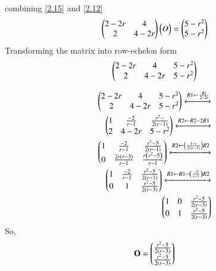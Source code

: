 \documentclass[journal,12pt,twocolumn]{IEEEtran}
\begin{document}
combining \ref{2.15} and \ref{2.12}
%
\begin{align}
\begin{pmatrix}2 - 2r  &  4 \\   2 & 4 - 2r \\\end{pmatrix} \begin{pmatrix}O\end{pmatrix} = \begin{pmatrix}5 - r^2 \\ 5 - r^2 \\\end{pmatrix} \label{2.17}
\end{align}
Transforming the matrix into row-echelon form \\
\begin{align}
\begin{pmatrix}2 - 2r  &  4 &  5 - r^2 \\   2 & 4 - 2r &  5 - r^2 \\\end{pmatrix}  \label{2.18}
\end{align}

	\begin{align}
\myvec{
	2 - 2r & 4 & 5 - r^2 \\
	2 & 4 - 2r & 5 - r^2 \\
}
\xleftrightarrow[]{R1 \leftarrow \frac{R1}{2 - 2r} } \nonumber  \\
%
\myvec{
	1 & \frac{-2}{r-1} & \frac{r^2 - }{2\left( r - 1\right)} \\
	2 & 4 - 2r & 5 - r^2\\
}
\xleftrightarrow[]{R2 \leftarrow  R2 - 2R1 } \nonumber  \\
%
\myvec{
	1 & \frac{-2}{r - 1} & \frac{r^2 - 5}{2 \left( r - 1 \right)} \\
	0 & \frac{2r\left(r - 3 \right) }{ r - 1} & \frac{r \left(r^2 - 5 \right)}{r - 1}
}
\xleftrightarrow[]{R2 \leftarrow \left( \frac{1 - r}{ 2r \left( r - 3\right)}\right)R2 } \nonumber  \\
%	
\myvec{
	1 & \frac{-2}{r - 1} & \frac{r^2 - 5}{2 \left(r - 1\right)} \\
	0 & 1 & \frac{r^2 - 5}{2 \left(r - 3\right)}
}
\xleftrightarrow[]{R1 \leftarrow  R1 - \left( \frac{-2}{r - 1} \right)R2 } \nonumber   \\
\myvec{
	1 & 0 & \frac{r^2 - 5}{2 \left(r - 3\right)} \\
	0 & 1 & \frac{r^2 - 5}{2 \left(r - 3\right)}
}
\end{align}
So,
\begin{align}
\mathbf{O} = \begin{pmatrix} \frac{r^2 - 5}{2 \left(r - 3\right)} \\ \frac{r^2 - 5}{2 \left(r - 3\right)} \\\end{pmatrix}
\end{align}
\end{document}
